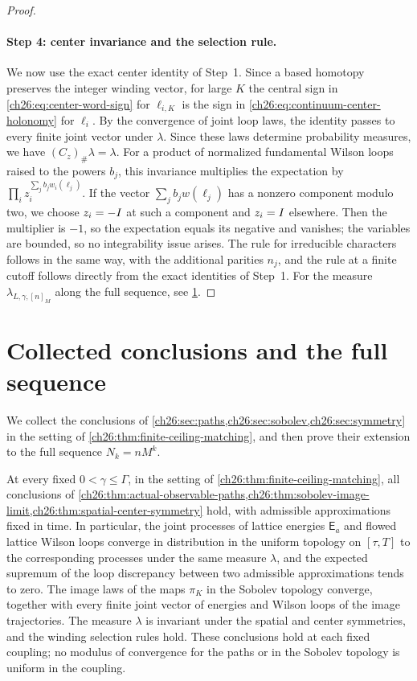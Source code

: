 \begin{proof}
\paragraph{Step 4: center invariance and the selection rule.}
We now use the exact center identity of Step~1. Since a based homotopy preserves the integer winding vector, for large $K$ the central sign in \eqref{ch26:eq:center-word-sign} for $\ell_{i,K}$ is the sign in \eqref{ch26:eq:continuum-center-holonomy} for $\ell_i$. By the convergence of joint loop laws, the identity passes to every finite joint vector under $\lambda$. Since these laws determine probability measures, we have $(C_z)_\#\lambda=\lambda$. For a product of normalized fundamental Wilson loops raised to the powers $b_j$, this invariance multiplies the expectation by $\prod_iz_i^{\sum_jb_jw_i(\ell_j)}$. If the vector $\sum_jb_jw(\ell_j)$ has a nonzero component modulo two, we choose $z_i=-I$ at such a component and $z_i=I$ elsewhere. Then the multiplier is $-1$, so the expectation equals its negative and vanishes; the variables are bounded, so no integrability issue arises. The rule for irreducible characters follows in the same way, with the additional parities $n_j$, and the rule at a finite cutoff follows directly from the exact identities of Step~1. For the measure $\lambda_{L,\gamma,[n]_M}$ along the full sequence, see \cref{ch26:sec:properties-full-sequence}.
\end{proof}

\section{Collected conclusions and the full sequence}\label{ch26:sec:properties-full-sequence}

We collect the conclusions of \cref{ch26:sec:paths,ch26:sec:sobolev,ch26:sec:symmetry} in the setting of \cref{ch26:thm:finite-ceiling-matching}, and then prove their extension to the full sequence $N_k=nM^k$.

\begin{corollary}\label{ch26:cor:finite-ceiling-observable-upgrades}
At every fixed $0<\gamma\le\Gamma$, in the setting of \cref{ch26:thm:finite-ceiling-matching}, all conclusions of \cref{ch26:thm:actual-observable-paths,ch26:thm:sobolev-image-limit,ch26:thm:spatial-center-symmetry} hold, with admissible approximations fixed in time. In particular, the joint processes of lattice energies $\mathsf E_a$ and flowed lattice Wilson loops converge in distribution in the uniform topology on $[\tau,T]$ to the corresponding processes under the same measure $\lambda$, and the expected supremum of the loop discrepancy between two admissible approximations tends to zero. The image laws of the maps $\pi_K$ in the Sobolev topology converge, together with every finite joint vector of energies and Wilson loops of the image trajectories. The measure $\lambda$ is invariant under the spatial and center symmetries, and the winding selection rules hold. These conclusions hold at each fixed coupling; no modulus of convergence for the paths or in the Sobolev topology is uniform in the coupling.
\end{corollary}

